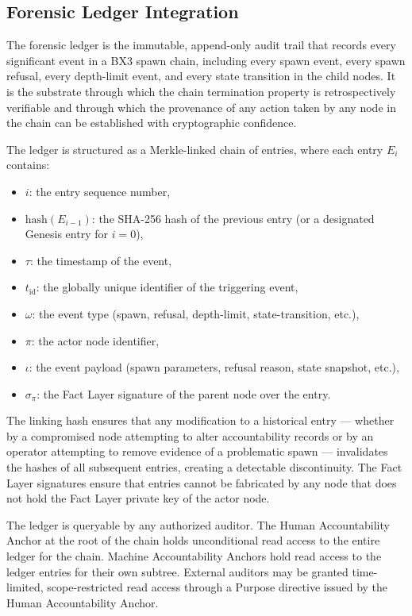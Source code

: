 \subsection{Forensic Ledger Integration}

The forensic ledger is the immutable, append-only audit trail that records every significant event in a BX3 spawn chain, including every spawn event, every spawn refusal, every depth-limit event, and every state transition in the child nodes. It is the substrate through which the chain termination property is retrospectively verifiable and through which the provenance of any action taken by any node in the chain can be established with cryptographic confidence.

The ledger is structured as a Merkle-linked chain of entries, where each entry $E_i$ contains:

\begin{itemize}\itemsep0pt
\item $i$: the entry sequence number,
\item $\text{hash}(E_{i-1})$: the SHA-256 hash of the previous entry (or a designated Genesis entry for $i=0$),
\item $\tau$: the timestamp of the event,
\item $t_{\text{id}}$: the globally unique identifier of the triggering event,
\item $\omega$: the event type (spawn, refusal, depth-limit, state-transition, etc.),
\item $\pi$: the actor node identifier,
\item $\iota$: the event payload (spawn parameters, refusal reason, state snapshot, etc.),
\item $\sigma_\pi$: the Fact Layer signature of the parent node over the entry.
\end{itemize}

The linking hash ensures that any modification to a historical entry — whether by a compromised node attempting to alter accountability records or by an operator attempting to remove evidence of a problematic spawn — invalidates the hashes of all subsequent entries, creating a detectable discontinuity. The Fact Layer signatures ensure that entries cannot be fabricated by any node that does not hold the Fact Layer private key of the actor node.

The ledger is queryable by any authorized auditor. The Human Accountability Anchor at the root of the chain holds unconditional read access to the entire ledger for the chain. Machine Accountability Anchors hold read access to the ledger entries for their own subtree. External auditors may be granted time-limited, scope-restricted read access through a Purpose directive issued by the Human Accountability Anchor.

